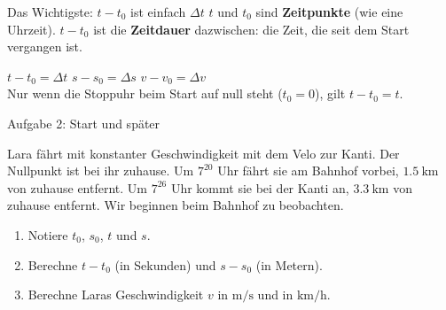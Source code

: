 \documentclass[14pt,aspectratio=169]{beamer}
\begin{document}
\begin{frame}{Das Wichtigste: $t-t_0$ ist einfach $\Delta t$}
  \small
  $t$ und $t_0$ sind \textbf{Zeitpunkte} (wie eine Uhrzeit).
  $t-t_0$ ist die \textbf{Zeitdauer} dazwischen: die Zeit, die seit dem
  Start vergangen ist.

  \centering

  \begin{merkbox}[Übersetzung: neue Schreibweise $=$ alte Schreibweise]
    \centering
    $t-t_0=\Delta t$ \qquad $s-s_0=\Delta s$ \qquad $v-v_0=\Delta v$\\[0.2em]
    Nur wenn die Stoppuhr beim Start auf null steht ($t_0=0$), gilt $t-t_0=t$.
  \end{merkbox}
\end{frame}

\begin{frame}{Aufgabe 2: Start und später}
  \begin{aufgabebox}[Aufgabe 2]
    \small
    Lara fährt mit konstanter Geschwindigkeit mit dem Velo zur Kanti. Der
    Nullpunkt ist bei ihr zuhause. Um $7^{20}$ Uhr fährt sie am Bahnhof
    vorbei, $\SI{1.5}{\kilo\meter}$ von zuhause entfernt. Um $7^{26}$ Uhr
    kommt sie bei der Kanti an, $\SI{3.3}{\kilo\meter}$ von zuhause
    entfernt. Wir beginnen beim Bahnhof zu beobachten.
    \begin{enumerate}
      \item[a)] Notiere $t_0$, $s_0$, $t$ und $s$.
      \item[b)] Berechne $t-t_0$ (in Sekunden) und $s-s_0$ (in Metern).
      \item[c)] Berechne Laras Geschwindigkeit $v$ in
        $\si{\meter\per\second}$ und in $\si{\kilo\meter\per\hour}$.
    \end{enumerate}
  \end{aufgabebox}
\end{frame}
\end{document}
